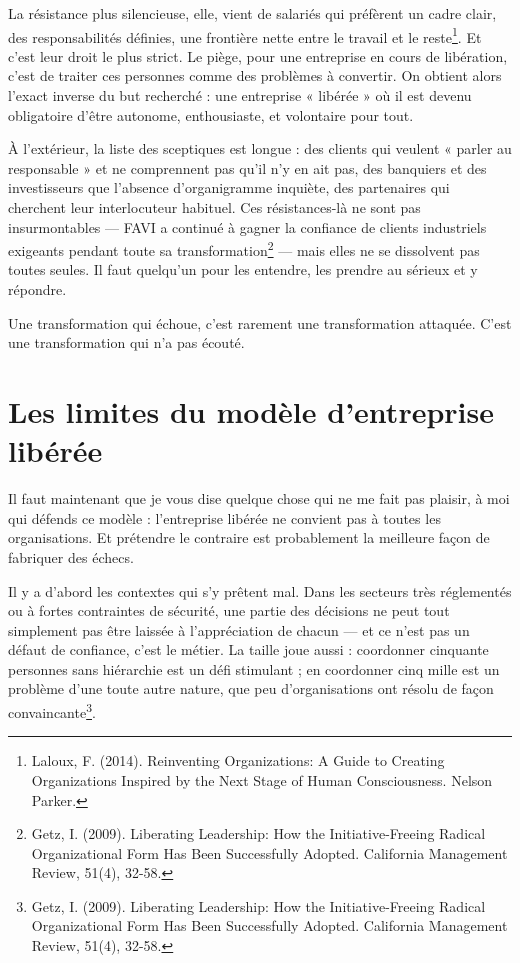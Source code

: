 La résistance plus silencieuse, elle, vient de salariés qui préfèrent un cadre clair, des responsabilités définies, une frontière nette entre le travail et le reste\footnote{Laloux, F. (2014). Reinventing Organizations: A Guide to Creating Organizations Inspired by the Next Stage of Human Consciousness. Nelson Parker.}. Et c'est leur droit le plus strict. Le piège, pour une entreprise en cours de libération, c'est de traiter ces personnes comme des problèmes à convertir. On obtient alors l'exact inverse du but recherché : une entreprise « libérée » où il est devenu obligatoire d'être autonome, enthousiaste, et volontaire pour tout.

À l'extérieur, la liste des sceptiques est longue : des clients qui veulent « parler au responsable » et ne comprennent pas qu'il n'y en ait pas, des banquiers et des investisseurs que l'absence d'organigramme inquiète, des partenaires qui cherchent leur interlocuteur habituel. Ces résistances-là ne sont pas insurmontables — FAVI a continué à gagner la confiance de clients industriels exigeants pendant toute sa transformation\footnote{Getz, I. (2009). Liberating Leadership: How the Initiative-Freeing Radical Organizational Form Has Been Successfully Adopted. California Management Review, 51(4), 32-58.} — mais elles ne se dissolvent pas toutes seules. Il faut quelqu'un pour les entendre, les prendre au sérieux et y répondre.

Une transformation qui échoue, c'est rarement une transformation attaquée. C'est une transformation qui n'a pas écouté.

\section{Les limites du modèle d'entreprise libérée}

Il faut maintenant que je vous dise quelque chose qui ne me fait pas plaisir, à moi qui défends ce modèle : l'entreprise libérée ne convient pas à toutes les organisations. Et prétendre le contraire est probablement la meilleure façon de fabriquer des échecs.

Il y a d'abord les contextes qui s'y prêtent mal. Dans les secteurs très réglementés ou à fortes contraintes de sécurité, une partie des décisions ne peut tout simplement pas être laissée à l'appréciation de chacun — et ce n'est pas un défaut de confiance, c'est le métier. La taille joue aussi : coordonner cinquante personnes sans hiérarchie est un défi stimulant ; en coordonner cinq mille est un problème d'une toute autre nature, que peu d'organisations ont résolu de façon convaincante\footnote{Getz, I. (2009). Liberating Leadership: How the Initiative-Freeing Radical Organizational Form Has Been Successfully Adopted. California Management Review, 51(4), 32-58.}.

